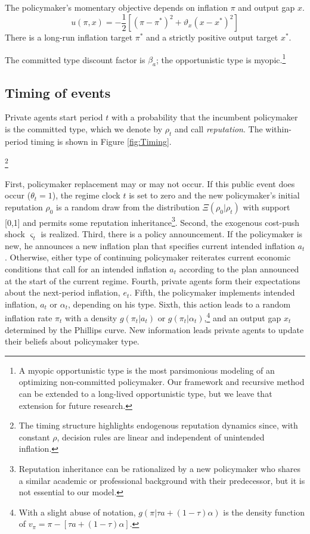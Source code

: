 \documentclass[12pt,letter,leqno]{article}
\theoremstyle{asn}
\theoremstyle{lem}
\theoremstyle{slem}
\theoremstyle{prop}
\theoremstyle{appprop}
\theoremstyle{rem}
\theoremstyle{defn}
\begin{document}
The policymaker's momentary objective depends on inflation $\pi $ and output gap $x$.%
\begin{equation}
u\left( \pi ,x \right) =-\frac{1}{2}[(\pi -\pi^*)^{2}+\vartheta
_{x}(x-x^{\ast })^{2}]  \label{OBJ}
\end{equation}%
There is a long-run inflation target $\pi ^{\ast }$ and
a strictly positive output target $x^{\ast }$.


The committed type discount factor is $\beta_a$; the opportunistic type is myopic.\footnote{A myopic opportunistic type is the most parsimonious modeling of an optimizing non-committed policymaker. Our framework and recursive method can be extended to a long-lived opportunistic type, but we leave that extension for future research.}


\subsection{Timing of events}\label{sec:timing}
Private agents start period $t$ with a probability that the incumbent
policymaker is the committed type, which we denote by $\rho _{t}$ and call \textit{reputation}. The within-period timing is shown in Figure \ref{fig:Timing}.
\begin{nberonly}
\footnote{The timing structure highlights endogenous reputation dynamics since, with constant $\rho$, decision rules are linear and independent of unintended inflation.}
\end{nberonly}
First, policymaker replacement may or may not occur. If this public event does occur ($\theta_t=1$), the regime clock $t$ is set to zero and the new policymaker's initial reputation $\rho_0$ is a random draw from the distribution $\Xi(\rho_0|\rho_t)$ with support [0,1] and permits some reputation inheritance\footnote{Reputation inheritance can be rationalized by a new policymaker who shares a similar academic or professional background with their predecessor, but it is not essential to our model.}. Second, the exogenous cost-push shock $\varsigma_t$ is realized. Third, there is a policy announcement. If the policymaker is new, he announces a new inflation plan that specifies current intended inflation $a_t$. Otherwise, either type of continuing policymaker reiterates current economic conditions that call for an intended inflation $a_t$ according to the plan announced at the start of the current regime. Fourth, private agents form their expectations about the next-period inflation, 
$e_t$. Fifth, the policymaker implements intended inflation, $a_t$ or $\alpha_t$, depending
on his type. Sixth, this action leads to a random inflation rate $\pi_t$ with a density $g(\pi_{t}|a_{t})$ or $g(\pi_{t}|\alpha_{t})$,\footnote{With a slight abuse of notation, $g(\pi|\tau a+(1-\tau)\alpha)$ is the density function of $v_{\pi}=\pi-[\tau a+(1-\tau)\alpha]$.} and an output gap $x_t$
determined by the Phillips curve. New information leads private agents to update their beliefs about policymaker type. 
\end{document}
